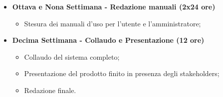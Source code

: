 {\begin{itemize}
\begin{itemize}
            \item Test e verifica dei bug e finalizzazione;
        \end{itemize}
        \item \textbf{Ottava e Nona Settimana - Redazione manuali (2x24 ore)} 
        \begin{itemize}
            \item Stesura dei manuali d'uso per l'utente e l'amministratore;
        \end{itemize}
        \item \textbf{Decima Settimana - Collaudo e Presentazione (12 ore)} 
        \begin{itemize}
            \item Collaudo del sistema completo;
            \item Presentazione del prodotto finito in presenza degli stakeholders;
            \item Redazione finale.
        \end{itemize}
    \end{itemize}
}

\newcommand{\totaleOre}{308}

\newcommand{\obiettiviObbligatori}{
	 \item \underline{\textit{O01}}: Integrazione di un sistema completo per l'apertura di serrature con lettura di codice a barre e NFC;
	 \item \underline{\textit{O02}}: Realizzazione della piattaforma web per la gestione degli accessi;
	 \item \underline{\textit{O03}}: Creazione del modello 3D dell'involucro e sua realizzazione con stampa 3D;
	 \item \underline{\textit{O04}}: Redazione della manualistica completa;
	 
}

\newcommand{\obiettiviDesiderabili}{
	 \item \underline{\textit{D01}}: Cura e definizione dell'interfaccia grafica della piattaforma web;
	 \item \underline{\textit{D02}}: Ottimizzazione del sistema esistente in termini di efficienza e prestazioni;
}

\newcommand{\obiettiviFacoltativi}{
	 \item \underline{\textit{F01}}: Creazione di un modello 3D modulare espandibile per future versioni;
}